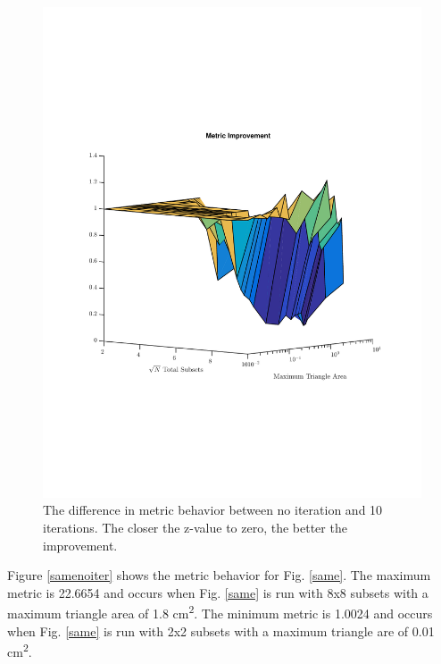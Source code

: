 \documentclass{anstrans}
\begin{document}
\begin{figure}[H]
\centering
\includegraphics[scale=0.5, trim = 2cm 6cm 2cm 7cm,clip]{figures/OppDiff.pdf}
\caption{The difference in metric behavior between no iteration and 10 iterations. The closer the z-value to zero, the better the improvement.}
\label{oppdiff}
\end{figure}

Figure \ref{samenoiter} shows the metric behavior for Fig. \ref{same}. The maximum metric is 22.6654 and occurs when Fig. \ref{same} is run with 8x8 subsets with a maximum triangle area of 1.8 cm\textsuperscript{2}. The minimum metric is 1.0024 and occurs when Fig. \ref{same} is run with 2x2 subsets with a maximum triangle are of 0.01 cm\textsuperscript{2}.
\end{document}
